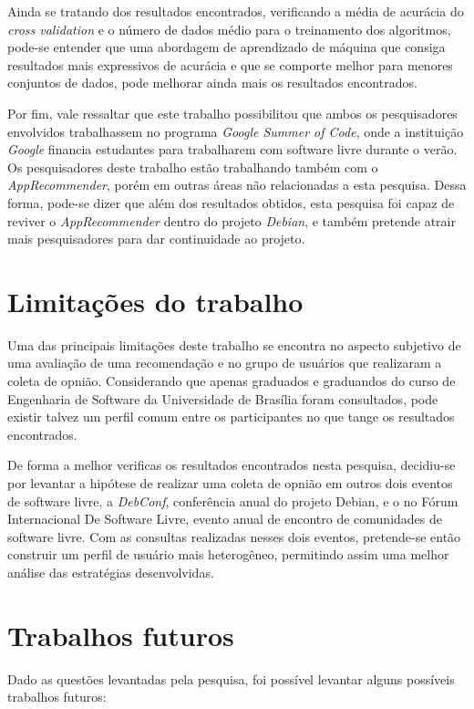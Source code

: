 Ainda se tratando dos resultados encontrados, verificando a média de acurácia do
\textit{cross validation} e o número de dados médio para o treinamento dos
algoritmos, pode-se entender que uma abordagem de aprendizado de máquina que
consiga resultados mais expressivos de acurácia e que se comporte melhor para
menores conjuntos de dados, pode melhorar ainda mais os resultados encontrados.

Por fim, vale ressaltar que este
trabalho possibilitou que ambos os pesquisadores envolvidos trabalhassem no
programa \textit{Google Summer of Code}, onde a instituição \textit{Google}
financia estudantes para trabalharem com software livre durante o verão. Os
pesquisadores deste trabalho estão trabalhando também com o
\textit{AppRecommender}, porém em outras áreas não relacionadas a esta pesquisa.
Dessa forma, pode-se dizer que além dos resultados obtidos, esta pesquisa foi
capaz de reviver o \textit{AppRecommender} dentro do projeto \textit{Debian},
e também pretende atrair mais pesquisadores para dar continuidade ao projeto.

\section{Limitações do trabalho}

Uma das principais limitações deste trabalho se encontra no aspecto subjetivo de
uma avaliação de uma recomendação e no grupo de usuários que realizaram a coleta
de opnião. Considerando que apenas graduados e graduandos do curso de Engenharia
de Software da Universidade de Brasília foram consultados, pode existir talvez
um perfil comum entre os participantes no que tange os resultados encontrados.

De forma a melhor verificas os resultados encontrados nesta pesquisa, decidiu-se
por levantar a hipótese de realizar uma coleta de opnião em outros dois eventos
de software livre, a \textit{DebConf}, conferência anual do projeto Debian, e o
no Fórum Internacional De Software Livre, evento anual de encontro de
comunidades de software livre. Com as consultas realizadas nesses dois eventos,
pretende-se então construir um perfil de usuário mais heterogêneo, permitindo
assim uma melhor análise das estratégias desenvolvidas.

\section{Trabalhos futuros}

Dado as questões levantadas pela pesquisa, foi possível levantar alguns
possíveis trabalhos futuros:

